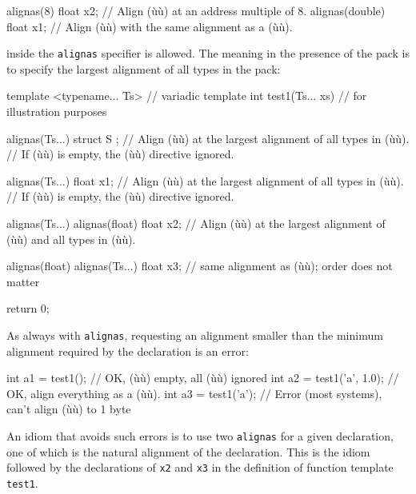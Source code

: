 \begin{emcppslisting}
alignas(8)      float x2;  // Align (ù{}ù) at an address multiple of 8.
alignas(double) float x1;  // Align (ù{}ù) with the same alignment as a (ù{}ù).
\end{emcppslisting}
    

\noindent {} inside the \lstinline!alignas! specifier is
allowed. The meaning in the presence of the pack is to specify the
largest alignment of all types in the pack:

\begin{emcppslisting}
template <typename... Ts>    // variadic template
int test1(Ts... xs)        // for illustration purposes
{
    alignas(Ts...) struct S { };
        // Align (ù{}ù) at the largest alignment of all types in (ù{}ù).
        // If (ù{}ù) is empty, the (ù{}ù) directive ignored.

    alignas(Ts...) float x1;
        // Align (ù{}ù) at the largest alignment of all types in (ù{}ù).
        // If (ù{}ù) is empty, the (ù{}ù) directive ignored.

    alignas(Ts...) alignas(float) float x2;
        // Align (ù{}ù) at the largest alignment of (ù{}ù) and all types in (ù{}ù).

    alignas(float) alignas(Ts...) float x3;
        // same alignment as (ù{}ù); order does not matter

    return 0;
}
\end{emcppslisting}
    

\noindent As always with \lstinline!alignas!, requesting an alignment smaller than
the minimum alignment required by the declaration is an error:

\begin{emcppslisting}
int a1 = test1();          // OK, (ù{}ù) empty, all (ù{}ù) ignored
int a2 = test1('a', 1.0);  // OK, align everything as a (ù{}ù).
int a3 = test1('a');       // Error (most systems), can't align (ù{}ù) to 1 byte
\end{emcppslisting}
    

\noindent An idiom that avoids such errors is to use two \lstinline!alignas! for a
given declaration, one of which is the natural alignment of the
declaration. This is the idiom followed by the declarations of
\lstinline!x2! and \lstinline!x3! in the definition of function template
\lstinline!test1!.

